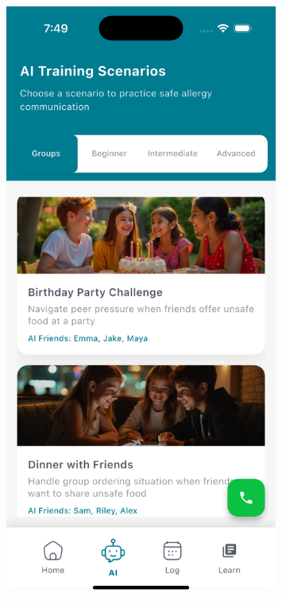 \documentclass[MScCS]{uccthesis}
\begin{document}
\begin{figure}[htbp]
    \centering
    \begin{minipage}[b]{0.45\textwidth}
        \centering
        \includegraphics[width=0.8\textwidth,height=0.45\textheight,keepaspectratio]{Figures/ai_training_groups.png}
    \end{minipage}
    \hfill
    \begin{minipage}[b]{0.45\textwidth}
        \centering

\end{minipage}
\end{figure}
\end{document}
